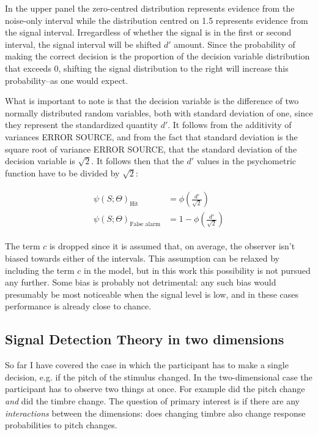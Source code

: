 \documentclass{article}\usepackage{knitr}
\begin{document}
In the upper panel the zero-centred distribution represents evidence from the noise-only interval while the distribution centred on 1.5 represents evidence from the signal interval. Irregardless of whether the signal is in the first or second interval, the signal interval will be shifted $d'$ amount. Since the probability of making the correct decision is the proportion of the decision variable distribution that exceeds 0, shifting the signal distribution to the right will increase this probability--as one would expect.

What is important to note is that the decision variable is the difference of two normally distributed random variables, both with standard  deviation of one, since they represent the standardized quantity $d'$. It follows from the additivity of variances ERROR SOURCE, and from the fact that standard deviation is the square root of variance ERROR SOURCE, that the standard deviation of the decision variable is $\sqrt{2}$. It follows then that the $d'$ values in the psychometric function have to be divided by $\sqrt{2}$:

\begin{align*}
\begin{split}
\psi(S; \Theta)_{\text{Hit}} &= \phi(\frac{d'}{\sqrt{2}}) \\
\psi(S; \Theta)_{\text{False alarm}} &=  1 - \phi(\frac{d'}{\sqrt{2}})
\end{split}
\end{align*}

The term $c$ is dropped since it is assumed that, on average, the observer isn't biased towards either of the intervals. This assumption can be relaxed by including the term $c$ in the model, but in this work this possibility is not pursued any further. Some bias is probably not detrimental: any such bias would presumably be most noticeable when the signal level is low, and in these cases performance is already close to chance. 



\subsection{Signal Detection Theory in two dimensions}

So far I have covered the case in which the participant has to make a single decision, e.g. if the pitch of the stimulus changed. In the two-dimensional case the participant has to observe two things at once. For example did the pitch change \textit{and} did the timbre change. The question of primary interest is if there are any \textit{interactions} between the dimensions: does changing timbre also change response probabilities to pitch changes.
\end{document}
